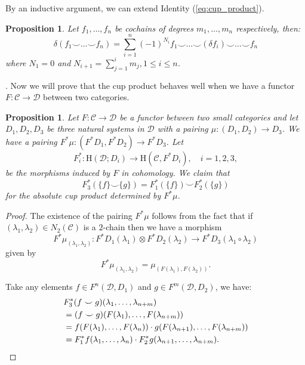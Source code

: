 \documentclass[12pt,reqno]{amsart}
\newtheorem{prop}[teo]{Proposition}
\theoremstyle{definition}
\theoremstyle{remark}
\numberwithin{figure}{section}%
\newcommand{\CC}{\mathcal{C}}
\newcommand{\Dc}{\mathcal{D}}
\newcommand{\Ho}{\mathrm{H}}
\begin{document}
By an inductive argument, we can extend Identity (\ref{eq:cup_product}).  
\begin{prop}Let $f_1, \dots , f_n$ be cochains of degrees $m_1, \dots, m_n$ respectively, then:
\begin{equation}\label{Product_Induction}
    \delta(f_1 \smile \dots \smile f_n)= \sum_{i=1}^{n} (-1)^{N_i} f_1 \smile \dots \smile (\delta f_i) \smile \dots \smile f_n
\end{equation}
where $N_1=0$ and $N_{i+1}=\sum_{j=1}^{i}m_j, 1\leq i \leq n$.
\end{prop}
. 
Now we will prove that the cup product behaves well when we have a functor $F \colon \CC \rightarrow \Dc$ between two categories. 

\begin{prop}
    Let $F \colon \CC \rightarrow \Dc$ be a functor between two small categories and let $D_1,D_2,D_3$ be three natural systems in $\Dc$ with a pairing $\mu: (D_1,D_2) \rightarrow D_3$. We have a pairing $F^*\mu: (F^*D_1,F^*D_2) \rightarrow F^*D_3$. Let  
    $$F_i^*\colon  \Ho(\Dc;D_i) \rightarrow \Ho(\CC,F^*D_i), \quad i=1,2,3,$$
    be the morphisms induced by $F$ in cohomology.
    We claim that 
    $$F_3^*(\{f\} \smile \{g\})=F_1^* (\{f\}) \smile F_2^* (\{g\})$$
    for the absolute cup product determined by $F^*\mu$.
\end{prop}

\begin{proof}
    The existence of the pairing $F^*\mu$ follows from the fact that if   $(\lambda_1,\lambda_2) \in N_2(\CC)$ is a $2$-chain then we have a morphism $$F^*\mu_{(\lambda_1,\lambda_2)}: F^*D_1(\lambda_1) \otimes F^*D_2(\lambda_2) \rightarrow F^*D_3(\lambda_1\circ \lambda_2) $$
    given by $$F^*\mu_{(\lambda_1,\lambda_2)}=\mu_{(F(\lambda_1),F(\lambda_2))}.$$
    
    Take any elements $f \in F^n(\Dc,D_1)$ and $g \in F^m(\Dc,D_2)$, we have:
    \begin{align*}
    &F_3^*(f \smile g)(\lambda_1,\ldots,\lambda_{n+m})\\&=(f \smile g)(F(\lambda_1),\ldots,F(\lambda_{n+m})) \\& = f(F(\lambda_1),\ldots,F(\lambda_{n}))\cdot g(F(\lambda_{n+1}),\ldots,F(\lambda_{n+m}))\\&= F_1^*f(\lambda_1,\ldots,\lambda_{n}) \cdot F^*_2g(\lambda_{n+1},\ldots,\lambda_{n+m}).\qedhere
    \end{align*}
\end{proof}
\end{document}
